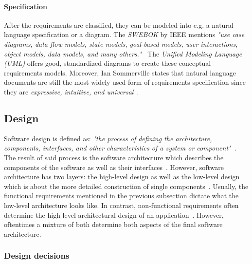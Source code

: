 \documentclass[12pt,a4paper,twoside]{report}
\begin{document}
\paragraph{Specification}
After the requirements are classified, they can be modeled into e.g.
a natural language specification or a diagram.
The \textit{SWEBOK} by IEEE mentions \textit{"use case diagrams, data flow models,
state models, goal-based models, user interactions,
object models, data models, and many others."}~\cite{swebok}
The \textit{Unified Modeling Language (UML)} offers good, standardized diagrams
to create these conceptual requirements models.
Moreover, Ian Sommerville states that natural language documents
are still the most widely used form of requirements specification since they are
\textit{expressive, intuitive, and universal}~\cite{sommerville-se}.


\subsection{Design} \label{subsect:design}

Software design is defined as: \textit{"the process of defining
the architecture, components, interfaces, and other characteristics
of a system or component"}~\cite{iso-se}.
The result of said process is the software architecture which describes the
components of the software as well as their interfaces~\cite{swebok}.
However, software architecture has two layers: the high-level design as well as
the low-level design which is about the more detailed
construction of single components~\cite{iso-sdlc}.
Usually, the functional requirements mentioned in the previous subsection dictate
what the low-level architecture looks like. In contrast, non-functional
requirements often determine the high-level architectural design of an application~\cite{bosch-sa}.
However, oftentimes a mixture of both determine both aspects of the final software architecture.


\subsubsection{Design decisions}
\end{document}
